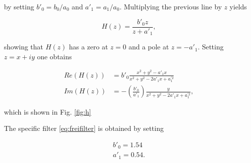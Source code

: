 \documentclass[12pt,a4paper]{article}
\begin{document}
by setting $b'_0=b_0/a_0$ and $a'_1=a_1/a_0$. Multiplying the previous line by $z$ yields

\begin{equation}\label{eq:iirf_trafofct_normal2}
H(z)=\frac{b'_0z}{z+a'_1},
\end{equation}

showing that $H(z)$ has a zero at $z=0$ and a pole at $z=-a'_1$. Setting $z=x+iy$ one obtains

\begin{align}
Re(H(z)) &= b'_0\frac{x^2+y^2-a'_1x}{x^2+y^2-2a'_1x+a_1^{'2}}\\
Im(H(z)) &= -\left(\frac{b'_0}{a'_1}\right)\frac{y}{x^2+y^2-2a'_1x+a_1^{'2}},
\end{align}

which is shown in Fig. \ref{fig:h}

The specific filter \eqref{eq:freifilter} is obtained by setting

\begin{align}
b'_0=1.54 \\
a'_1=0.54.
\end{align}






\end{document}

